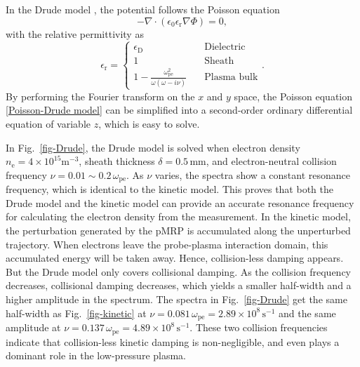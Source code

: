 \documentclass[superscriptaddress,preprint]{revtex4}  %
\begin{document}
In the Drude model \cite{Lapke2013}, the potential follows the Poisson equation
\begin{equation}
-\nabla \cdot \left(\epsilon_\mathrm{0} \epsilon_\mathrm{r} \nabla \Phi \right)=0,
\label{Poisson-Drude model}
\end{equation} 
with the relative permittivity as
\begin{equation}
\epsilon_\mathrm{r}=
\begin{cases}
\epsilon_\mathrm{D}    &\text{Dielectric}\\
1     &\text{Sheath}\\
\displaystyle{1-\frac{\omega_\mathrm{pe}^2}{\omega(\omega-i \nu)}}    \quad &\text{Plasma bulk}
\end{cases}.
\end{equation}
By performing the Fourier transform on the $x$ and $y$ space, the Poisson equation \eqref{Poisson-Drude model} can be simplified into a second-order ordinary differential equation of variable $z$, which is easy to solve. 

In Fig.~\ref{fig-Drude}, the Drude model is solved when electron density $n_\mathrm{e}=4\times10^{15} \mathrm{m}^{-3}$, sheath thickness $\delta=0.5\,\mathrm{mm}$, and electron-neutral collision frequency $\nu=0.01\sim0.2\,\omega_\mathrm{pe}$. As $\nu$ varies, the spectra show a constant resonance frequency, which is identical to the kinetic model. This proves that both the Drude model and the kinetic model can provide an accurate resonance frequency for calculating the electron density from the measurement. In the kinetic model, the perturbation generated by the pMRP is accumulated along the unperturbed trajectory. When electrons leave the probe-plasma interaction domain, this accumulated energy will be taken away. Hence, collision-less damping appears. But the Drude model only covers collisional damping. As the collision frequency decreases, collisional damping decreases, which yields a smaller half-width and a higher amplitude in the spectrum. The spectra in Fig.~\ref{fig-Drude} get the same half-width as Fig.~\ref{fig-kinetic} at $\nu=0.081\,\omega_\mathrm{pe}=2.89\times10^8\,\mathrm{s}^{-1}$ and the same amplitude at $\nu=0.137\,\omega_\mathrm{pe}=4.89\times10^8\,\mathrm{s}^{-1}$. These two collision frequencies indicate that collision-less kinetic damping is non-negligible, and even plays a dominant role in the low-pressure plasma.
\end{document}

